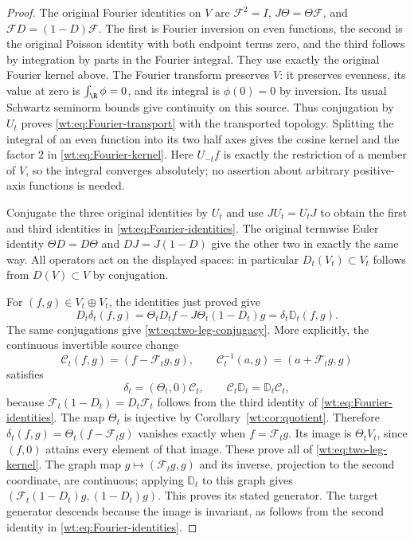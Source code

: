 \begin{proof}
The original Fourier identities on $V$ are
$\mathcal F^2=I$, $J\Theta=\Theta\mathcal F$, and
$\mathcal FD=(1-D)\mathcal F$.  The first is Fourier inversion
on even functions, the second is the original Poisson identity
with both endpoint terms zero, and the third follows by integration
by parts in the Fourier integral.  They use exactly the original
Fourier kernel above.  The Fourier transform preserves $V$:
it preserves evenness, its value at zero is $\int_\R\phi=0$,
and its integral is $\phi(0)=0$ by inversion.  Its usual Schwartz
seminorm bounds give continuity on this source.  Thus conjugation
by $U_t$ proves \eqref{wt:eq:Fourier-transport} with the
transported topology.  Splitting the integral of an even function
into its two half axes gives the cosine kernel and the factor
$2$ in \eqref{wt:eq:Fourier-kernel}.  Here $U_{-t}f$ is exactly
the restriction of a member of $V$, so the integral converges
absolutely; no assertion about arbitrary positive-axis functions
is needed.

Conjugate the three original identities by $U_t$ and use
$JU_t=U_tJ$ to obtain the first and third identities in
\eqref{wt:eq:Fourier-identities}.  The original termwise
Euler identity $\Theta D=D\Theta$ and $DJ=J(1-D)$ give the
other two in exactly the same way.  All operators act on the
displayed spaces: in particular $D_t(V_t)\subset V_t$ follows
from $D(V)\subset V$ by conjugation.

For $(f,g)\in V_t\oplus V_t$, the identities just proved give
\[
 D_t\delta_t(f,g)
 =\Theta_tD_tf-J\Theta_t(1-D_t)g
 =\delta_t\mathbb D_t(f,g).
\]
The same conjugations give \eqref{wt:eq:two-leg-conjugacy}.
More explicitly, the continuous invertible source change
\[
 \mathcal C_t(f,g)=(f-\mathcal F_tg,g),\qquad
 \mathcal C_t^{-1}(a,g)=(a+\mathcal F_tg,g)
\]
satisfies
\[
 \delta_t=(\Theta_t,0)\mathcal C_t,\qquad
 \mathcal C_t\mathbb D_t=\mathbb D_t\mathcal C_t,
\]
because $\mathcal F_t(1-D_t)=D_t\mathcal F_t$ follows from
the third identity of \eqref{wt:eq:Fourier-identities}.
The map $\Theta_t$ is injective by
Corollary~\ref{wt:cor:quotient}.  Therefore
$\delta_t(f,g)=\Theta_t(f-\mathcal F_tg)$ vanishes exactly
when $f=\mathcal F_tg$.  Its image is $\Theta_tV_t$, since
$(f,0)$ attains every element of that image.  These prove all
of \eqref{wt:eq:two-leg-kernel}.  The graph map
$g\mapsto(\mathcal F_tg,g)$ and its inverse, projection to the
second coordinate, are continuous; applying $\mathbb D_t$
to this graph gives
$(\mathcal F_t(1-D_t)g,(1-D_t)g)$.  This proves its stated
generator.  The target generator descends because the image
is invariant, as follows from the second identity in
\eqref{wt:eq:Fourier-identities}.
\end{proof}

